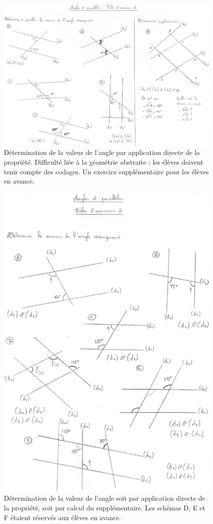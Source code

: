\begin{figure}[h!]
    \centering
    \includegraphics[width=0.8\linewidth]{img/anglesfiche2.jpg}
    \caption{Détermination de la valeur de l'angle par application directe de la propriété. Difficulté liée à la géométrie abstraite : les élèves doivent tenir compte des codages. Un exercice supplémentaire pour les élèves en avance.}
    \label{fig:angles-fiche2}
\end{figure}

\begin{figure}[h!]
    \centering
    \includegraphics[width=0.6\linewidth]{img/anglesfiche3.jpg}
    \caption{Détermination de la valeur de l'angle soit par application directe de la propriété, soit par calcul du supplémentaire. Les schémas D, E et F étaient réservés aux élèves en avance.}
    \label{fig:angles-fiche3}
\end{figure}

